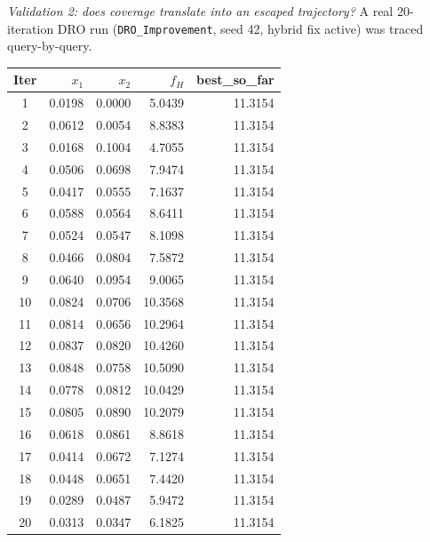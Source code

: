 \documentclass[11pt]{article}
\begin{document}
\textit{Validation 2: does coverage translate into an escaped trajectory?} A
real 20-iteration DRO run (\texttt{DRO\_Improvement}, seed 42, hybrid fix
active) was traced query-by-query.

\begin{center}
\small
\begin{tabular}{crrrr}
\toprule
\textbf{Iter} & \textbf{$x_1$} & \textbf{$x_2$} & \textbf{$f_H$} & \textbf{best\_so\_far} \\
\midrule
1  & 0.0198 & 0.0000 & 5.0439  & 11.3154 \\
2  & 0.0612 & 0.0054 & 8.8383  & 11.3154 \\
3  & 0.0168 & 0.1004 & 4.7055  & 11.3154 \\
4  & 0.0506 & 0.0698 & 7.9474  & 11.3154 \\
5  & 0.0417 & 0.0555 & 7.1637  & 11.3154 \\
6  & 0.0588 & 0.0564 & 8.6411  & 11.3154 \\
7  & 0.0524 & 0.0547 & 8.1098  & 11.3154 \\
8  & 0.0466 & 0.0804 & 7.5872  & 11.3154 \\
9  & 0.0640 & 0.0954 & 9.0065  & 11.3154 \\
10 & 0.0824 & 0.0706 & 10.3568 & 11.3154 \\
11 & 0.0814 & 0.0656 & 10.2964 & 11.3154 \\
12 & 0.0837 & 0.0820 & 10.4260 & 11.3154 \\
13 & 0.0848 & 0.0758 & 10.5090 & 11.3154 \\
14 & 0.0778 & 0.0812 & 10.0429 & 11.3154 \\
15 & 0.0805 & 0.0890 & 10.2079 & 11.3154 \\
16 & 0.0618 & 0.0861 & 8.8618  & 11.3154 \\
17 & 0.0414 & 0.0672 & 7.1274  & 11.3154 \\
18 & 0.0448 & 0.0651 & 7.4420  & 11.3154 \\
19 & 0.0289 & 0.0487 & 5.9472  & 11.3154 \\
20 & 0.0313 & 0.0347 & 6.1825  & 11.3154 \\
\bottomrule
\end{tabular}
\end{center}
\end{document}
